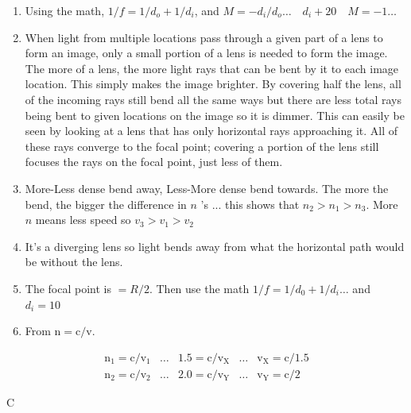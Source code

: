 \begin{enumerate}
\begin{enumerate}
  \item Using the math, $1 / f=1 / d_{o}+1 / d_{i}$, and $M=-d_{i} / d_{o} \ldots \quad d_{i}+20 \quad M=-1 \ldots$
  \item When light from multiple locations pass through a given part of a lens to form an image, only a small portion of a lens is needed to form the image. The more of a lens, the more light rays that can be bent by it to each image location. This simply makes the image brighter. By covering half the lens, all of the incoming rays still bend all the same ways but there are less total rays being bent to given locations on the image so it is dimmer. This can easily be seen by looking at a lens that has only horizontal rays approaching it. All of these rays converge to the focal point; covering a portion of the lens still focuses the rays on the focal point, just less of them.
  \item More-Less dense bend away, Less-More dense bend towards. The more the bend, the bigger the difference in $n$ 's ... this shows that $n_{2}>n_{1}>n_{3}$. More $n$ means less speed so $v_{3}>v_{1}>v_{2}$
  \item It's a diverging lens so light bends away from what the horizontal path would be without the lens.
  \item The focal point is $=R / 2$. Then use the math $1 / f=1 / d_{0}+1 / d_{i} \ldots$ and $d_{i}=10$
  \item From $\mathrm{n}=\mathrm{c} / \mathrm{v}$.
\end{enumerate}

$$
\begin{array}{lllll}
\mathrm{n}_{1}=\mathrm{c} / \mathrm{v}_{1} & \ldots & 1.5=\mathrm{c} / \mathrm{v}_{\mathrm{X}} & \ldots & \mathrm{v}_{\mathrm{X}}=\mathrm{c} / 1.5 \\
\mathrm{n}_{2}=\mathrm{c} / \mathrm{v}_{2} & \ldots & 2.0=\mathrm{c} / \mathrm{v}_{\mathrm{Y}} & \ldots & \mathrm{v}_{\mathrm{Y}}=\mathrm{c} / 2
\end{array}
$$

C


\end{enumerate}

